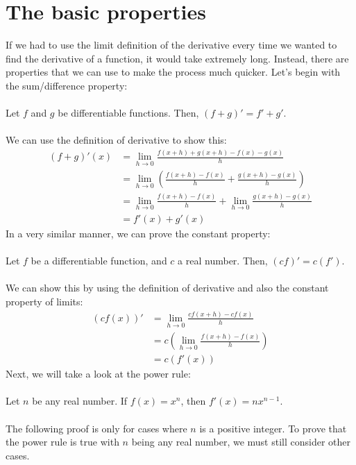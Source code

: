 \documentclass[11pt]{scrartcl}
\begin{document}
\maketitle
\noindent

\section{The basic properties}
\noindent
If we had to use the limit definition of the derivative every time we wanted to find the derivative of a function, it would take extremely long. Instead, there are properties that we can use to make the process much quicker. Let's begin with the sum/difference property:\\
\noindent\\
Let $f$ and $g$ be differentiable functions. Then, $(f+g)'=f'+g'$.\\
\noindent\\
We can use the definition of derivative to show this:
\begin{align*}
(f+g)'(x) &= \lim_{h \to 0} \frac{f(x+h)+g(x+h)-f(x)-g(x)}{h}\\
          &= \lim_{h \to 0}\left(\frac{f(x+h)-f(x)}{h}+\frac{g(x+h)-g(x)}{h}\right)\\
          &= \lim_{h \to 0} \frac{f(x+h)-f(x)}{h}+\lim_{h \to 0} \frac{g(x+h)-g(x)}{h}\\
          &= f'(x)+g'(x)   
\end{align*}
\noindent
In a very similar manner, we can prove the constant property:\\
\noindent\\
Let $f$ be a differentiable function, and $c$ a real number. Then,  $(cf)'=c(f')$.\\
\noindent\\
We can show this by using the definition of derivative and also the constant property of limits:
\begin{align*}
    (cf(x))' & = \lim_{h \to 0} \frac{cf(x+h)-cf(x)}{h}\\
& = c\left(\lim_{h \to 0} \frac{f(x+h)-f(x)}{h}\right)\\
& = c(f'(x))
\end{align*}
\noindent
Next, we will take a look at the power rule:\\
\noindent\\
Let $n$ be any real number. If $f(x)=x^n$, then $f'(x)=nx^{n-1}$.\\
\noindent\\
The following proof is only for cases where $n$ is a positive integer. To prove that the power rule is true with $n$ being any real number, we must still consider other cases. 
\end{document}
